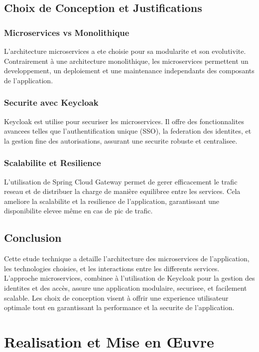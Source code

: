 \documentclass[a4paper, 11pt, openany]{report}
\begin{document}
\section{Choix de Conception et Justifications}
\subsection{Microservices vs Monolithique}
L'architecture microservices a ete choisie pour sa modularite et son evolutivite. Contrairement à une architecture monolithique, les microservices permettent un developpement, un deploiement et une maintenance independants des composants de l'application.

\subsection{Securite avec Keycloak}
Keycloak est utilise pour securiser les microservices. Il offre des fonctionnalites avancees telles que l'authentification unique (SSO), la federation des identites, et la gestion fine des autorisations, assurant une securite robuste et centralisee.

\subsection{Scalabilite et Resilience}
L'utilisation de Spring Cloud Gateway permet de gerer efficacement le trafic reseau et de distribuer la charge de manière equilibree entre les services. Cela ameliore la scalabilite et la resilience de l'application, garantissant une disponibilite elevee même en cas de pic de trafic.

\section{Conclusion}
Cette etude technique a detaille l'architecture des microservices de l'application, les technologies choisies, et les interactions entre les differents services. L'approche microservices, combinee à l'utilisation de Keycloak pour la gestion des identites et des accès, assure une application modulaire, securisee, et facilement scalable. Les choix de conception visent à offrir une experience utilisateur optimale tout en garantissant la performance et la securite de l'application.
\chapter{Realisation et Mise en Œuvre}
\end{document}
